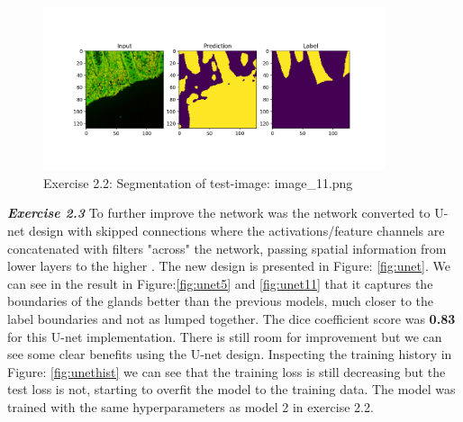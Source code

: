 \documentclass[a4paper,10pt]{article}
\begin{document}
\begin{figure}[ht!]
\centering
\includegraphics[width=100mm]{figures/assignment_3/segmentation_worse_best.png}
\caption{Exercise 2.2: Segmentation of test-image: image\_11.png}
\label{fig:worst}
\end{figure}

\newpage


\textit{\textbf{Exercise 2.3}} 
To further improve the network was the network converted to U-net design with skipped connections where the activations/feature channels are concatenated with filters "across" the network, passing spatial information from lower layers to the higher \cite{UNet}. The new design is presented in Figure: \ref{fig:unet}. We can see in the result in Figure:\ref{fig:unet5} and \ref{fig:unet11} that it captures the boundaries of the glands better than the previous models, much closer to the label boundaries and not as lumped together. The dice coefficient score was \textbf{0.83} for this U-net implementation. There is still room for improvement but we can see some clear benefits using the U-net design. Inspecting the training history in Figure: \ref{fig:unethist} we can see that the training loss is still decreasing but the test loss is not, starting to overfit the model to the training data. The model was trained with the same hyperparameters as model 2 in exercise 2.2.
\end{document}
